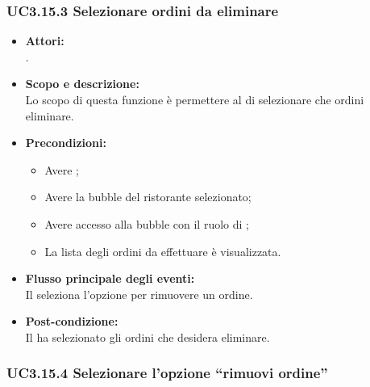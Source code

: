 \subsubsection{UC3.15.3 Selezionare ordini da eliminare} \label{UC3.15.3}

\begin{itemize}
	\item \textbf{Attori:}
	\\.
	\item \textbf{Scopo e descrizione:} 
	\\Lo scopo di questa funzione è permettere al  di selezionare che ordini eliminare.
	\item \textbf{Precondizioni:}
	\begin{itemize}
		\item Avere ;
		\item Avere la bubble del ristorante selezionato;
		\item Avere accesso alla bubble con il ruolo di ;
		\item La lista degli ordini da effettuare è visualizzata.
	\end{itemize}
	\item \textbf{Flusso principale degli eventi:}
	\\Il {} seleziona l’opzione per rimuovere un ordine.
	\item \textbf{Post-condizione:}
	\\Il {} ha selezionato gli ordini che desidera eliminare.
\end{itemize}

\subsubsection{UC3.15.4 Selezionare l’opzione “rimuovi ordine”} \label{UC3.15.4}

